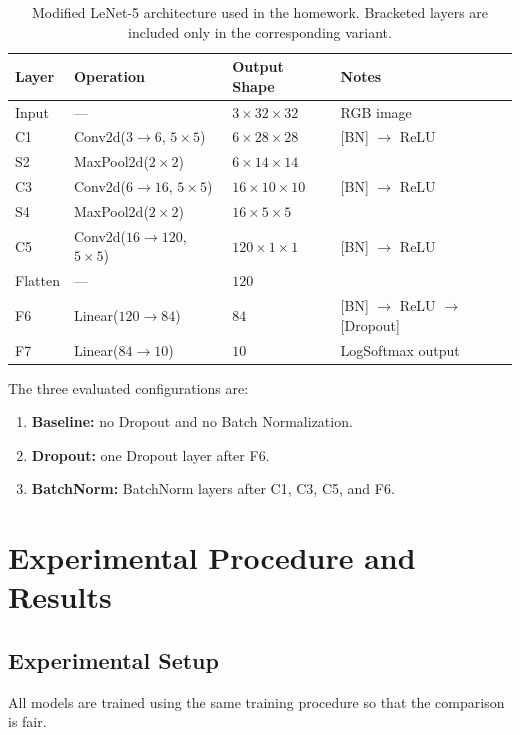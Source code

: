 \documentclass[11pt]{article}
\begin{document}
\begin{table}[H]
  \centering
  \begin{tabular}{llll}
    \toprule
    \textbf{Layer} & \textbf{Operation} & \textbf{Output Shape} & \textbf{Notes} \\
    \midrule
    Input   & ---                                & $3 \times 32 \times 32$ & RGB image \\
    C1      & Conv2d($3{\to}6$, $5 \times 5$)   & $6 \times 28 \times 28$ & [BN] $\to$ ReLU \\
    S2      & MaxPool2d($2 \times 2$)           & $6 \times 14 \times 14$ & \\
    C3      & Conv2d($6{\to}16$, $5 \times 5$)  & $16 \times 10 \times 10$ & [BN] $\to$ ReLU \\
    S4      & MaxPool2d($2 \times 2$)           & $16 \times 5 \times 5$ & \\
    C5      & Conv2d($16{\to}120$, $5 \times 5$)& $120 \times 1 \times 1$ & [BN] $\to$ ReLU \\
    Flatten & ---                               & $120$ & \\
    F6      & Linear($120{\to}84$)              & $84$ & [BN] $\to$ ReLU $\to$ [Dropout] \\
    F7      & Linear($84{\to}10$)               & $10$ & LogSoftmax output \\
    \bottomrule
  \end{tabular}
  \caption{Modified LeNet-5 architecture used in the homework. Bracketed layers are
  included only in the corresponding variant.}
\end{table}

The three evaluated configurations are:
\begin{enumerate}
  \item \textbf{Baseline:} no Dropout and no Batch Normalization.
  \item \textbf{Dropout:} one Dropout layer after F6.
  \item \textbf{BatchNorm:} BatchNorm layers after C1, C3, C5, and F6.
\end{enumerate}

\section{Experimental Procedure and Results}

\subsection{Experimental Setup}
All models are trained using the same training procedure so that the comparison is
fair.
\end{document}
